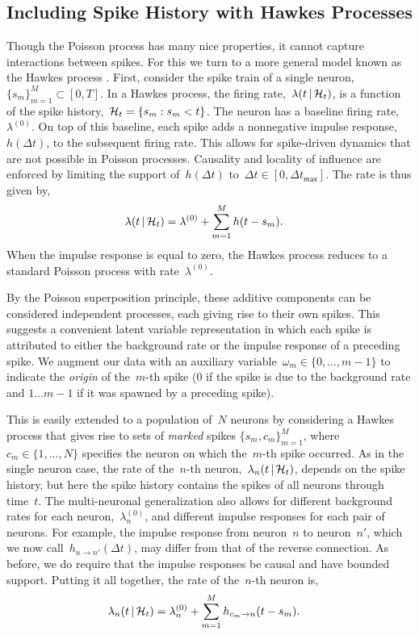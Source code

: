 \subsection{Including Spike History with Hawkes Processes}
Though the Poisson process has many nice properties, it cannot capture
interactions between spikes. For this we turn to a more general model
known as the Hawkes process \citep{Hawkes-1971}.  First, consider the
spike train of a single neuron,~${\{s_m\}_{m=1}^M \subset [0,T]}$.  In
a Hawkes process, the firing rate,~$\lambda(t \,|\, \mathcal{H}_t)$,
is a function of the spike history,~${\mathcal{H}_t = \{s_m: s_m < t\}}$.
The neuron has a baseline firing rate,~$\lambda^{(0)}$. On top of this
baseline, each spike adds a nonnegative impulse response,~$h(\Delta
t)$, to the subsequent firing rate.  This allows for spike-driven
dynamics that are not possible in Poisson processes.  Causality and
locality of influence are enforced by limiting the support
of~$h(\Delta t)$ to~${\Delta t \in [0,\Delta t_{\mathsf{max}}]}$.  The
rate is thus given by,
\begin{align*}
  \lambda(t \,|\, \mathcal{H}_t)
  &= \lambda^{(0)} + \sum_{m=1}^M h(t - s_m).
\end{align*}
When the impulse response is equal to zero, the Hawkes process
reduces to a standard Poisson process with rate~$\lambda^{(0)}$.

By the Poisson superposition principle, these additive
components can be considered independent processes, each giving rise
to their own spikes.  This suggests a convenient latent variable
representation in which each spike is attributed to either the
background rate or the impulse response of a preceding spike.  We
augment our data with an auxiliary
variable~${\omega_m \in\{0,\ldots, m-1\}}$ to indicate the \emph{origin} of
the~$m$-th spike ($0$ if the spike is due to the background rate and
${1\ldots m-1}$ if it was spawned by a preceding spike). 

This is easily extended to a population of~$N$ neurons by considering
a Hawkes process that gives rise to sets of \emph{marked} spikes
$\{s_m,c_m\}_{m=1}^M$, where~${c_m\in\{1,\ldots,N\}}$ specifies the
neuron on which the~$m$-th spike occurred.  As in the single neuron
case, the rate of the~$n$-th neuron,~${\lambda_n(t\,|\, \mathcal{H}_t)}$,
depends on the spike history, but here the spike history contains the
spikes of all neurons through time~$t$.  The multi-neuronal
generalization also allows for different background rates for each
neuron,~$\lambda^{(0)}_{n}$, and different impulse responses for each
pair of neurons. For example, the impulse response from neuron~$n$ to
neuron~$n'$, which we now call~$h_{n \to n'}(\Delta t)$, may differ
from that of the reverse connection. As before, we do require that the
impulse responses be causal and have bounded support.  Putting it all
together, the rate of the~$n$-th neuron is,
\begin{align}
  \label{eq:hawkes_rate}
  \lambda_n(t \,|\, \mathcal{H}_t)
  &= \lambda^{(0)}_{n} + \sum_{m=1}^M h_{c_m \to n}(t - s_m).
\end{align}

